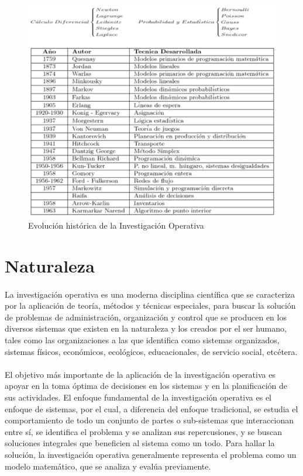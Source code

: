 \documentclass[12pt, a4paper,spanish]{article}
\begin{document}
		\begin{figure}[H]
				\centering
				\includegraphics[width=120mm]{res/desarrollo-historico-de-la-investigacion-de-operaciones.png}
				\caption{Evolución histórica de la Investigación Operativa \protect\cite{gestiopolis_IO_history}}
			\end{figure}


	\section{Naturaleza}
		\paragraph{}
		La investigación operativa es una moderna disciplina científica que se caracteriza por la aplicación de teoría, métodos y técnicas especiales, para buscar la solución de problemas de administración, organización y control que se producen en los diversos sistemas que existen en la naturaleza y los creados por el ser humano, tales como las organizaciones a las que identifica como sistemas organizados, sistemas físicos, económicos, ecológicos, educacionales, de servicio social, etcétera.\cite{wikipedia_IO}

		\paragraph{}
		El objetivo más importante de la aplicación de la investigación operativa es apoyar en la toma óptima de decisiones en los sistemas y en la planificación de sus actividades. El enfoque fundamental de la investigación operativa es el enfoque de sistemas, por el cual, a diferencia del enfoque tradicional, se estudia el comportamiento de todo un conjunto de partes o sub-sistemas que interaccionan entre sí, se identifica el problema y se analizan sus repercusiones, y se buscan soluciones integrales que beneficien al sistema como un todo. Para hallar la solución, la investigación operativa generalmente representa el problema como un modelo matemático, que se analiza y evalúa previamente.\cite{wikipedia_IO}
\end{document}
